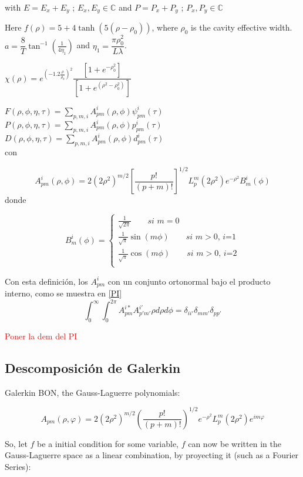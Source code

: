 	
	with $E=E_x+E_y$ ;  $E_x , E_y \in \mathbb{C}$ and $P=P_x+P_y$ ; $P_x , P_y \in \mathbb{C}$
	
	Here $f(\rho)=5+4\tanh(5(\rho-\rho_0))$, where $\rho_0$ is the cavity effective width.
	$a=\dfrac{8}{T}\tan^{-1}(\frac{1}{4\eta_{1}})$ and $\eta_1=\dfrac{\pi \rho^2_0}{L\lambda}$.
	
	$\chi(\rho)=e^{(-1.2 \frac{\rho}{\rho_0})^2}\dfrac{[1+e^{-\rho_0^2}]}{[1+e^{(\rho^2-\rho_0^2)}]}$

	
	$F(\rho,\phi,\eta,\tau)=\sum_{p,m,i} A^i_{pm}(\rho,\phi) \psi^i_{pm}(\tau)$\\
	$P(\rho,\phi,\eta,\tau)=\sum_{p,m,i} A^i_{pm}(\rho,\phi) p^i_{pm}(\tau)$\\
	$D(\rho,\phi,\eta,\tau)=\sum_{p,m,i} A^i_{pm}(\rho,\phi) d^i_{pm}(\tau)$\\
	
	con 
	
	\[ A^i_{pm}(\rho,\phi)=2(2\rho^2)^{m/2}[\frac{p!}{(p+m)!}]^{1/2}L^m_p(2\rho^2)e^{-\rho^2}B^i_{m}(\phi)   \]
	donde 

	\[B^i_m(\phi)=
	\begin{cases}
	\frac{1}{\sqrt{2\pi}} \qquad \textit{si $m=0$} \\
	\frac{1}{\sqrt{\pi}}\sin(m\phi) \qquad \textit{si $m>0$, i=1}\\
	\frac{1}{\sqrt{\pi}}\cos(m\phi) \qquad \textit{si $m>0$, i=2} \\
	\end{cases}
	\]

	
	Con esta definición, los $A^i_{pm}$ con un conjunto ortonormal bajo el producto interno, como se muestra en \ref{PI}
	\[\int_{0}^{\infty}\int_{0}^{2\pi} A^{i*}_{pm} A^{i'}_{p'm'} \rho d\rho d\phi=\delta_{i i'}\delta_{m m'}\delta_{p p'}    \]

	\textcolor{red}{Poner la dem del PI}
	
	
		
	\subsection{Descomposición de Galerkin}
	
		
		Galerkin BON, the Gauss-Laguerre polynomials:
		
		$$ A_{pm}(\rho, \varphi)=2(2\rho^2)^{m/2}(\dfrac{p!}{(p+m)!})^{1/2}e^{-\rho{^2}}L_p^m(2\rho{^2})e^{im\varphi} $$
		
		So, let $f$ be a initial condition for some variable,  $f$ can now be written in the Gauss-Laguerre space as a linear combination, by proyecting it (such as a Fourier Series):
		
